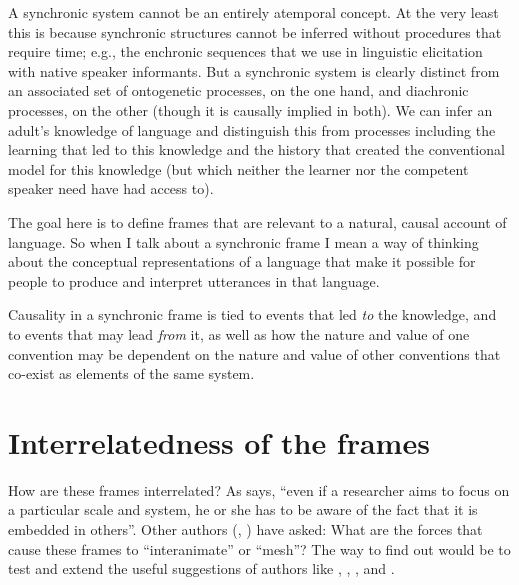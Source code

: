 A synchronic system cannot be an entirely atemporal concept. At the very 
least this is because synchronic structures cannot be inferred without 
procedures that require time; e.g., the enchronic sequences that we use
in linguistic elicitation with native speaker informants. But a synchronic system is 
clearly distinct from an associated set of ontogenetic processes, on the one hand, 
and diachronic processes, on the other (though it is causally 
implied in both). We can infer an adult's knowledge of language and 
distinguish this from processes including the learning that led to this 
knowledge and the history that created the conventional model for 
this knowledge (but which neither the learner nor the competent speaker 
need have had access to). 



The goal here is to define frames that are relevant to a natural, causal account of language. So when I talk about a 
synchronic frame I mean a way of thinking about the conceptual representations of a language that make it possible for people to produce and interpret utterances in that language. 



Causality in a synchronic frame is tied to events that led \textit{to} 
the knowledge, and to events that may lead \textit{from} it, as well as how the 
nature and value of one convention may be dependent on the nature and 
value of other conventions that co-exist as elements of the same system.



\section{Interrelatedness of the frames}



How are these frames interrelated? As \citet[276]{raczaszek-leonardi_multiple_2010} says, ``even if a researcher aims to focus on a particular scale and system, he 
or she has to be aware of the fact that it is embedded in others''. Other 
authors (\citealt[179]{cole_cultural_1996}, \citealt[192]{macwhinney_emergence_2005}) have asked: What are the 
forces that cause these frames to ``interanimate'' or ``mesh''? The way to find out would be to test and extend the useful suggestions of authors like \citet{newell_unified_1990}, \citet[184--185]{cole_cultural_1996}, \citet{macwhinney_emergence_2005}, \citet[279--286]{lemke_across_2000} and \citet{uryu_ecology_2014}. 



